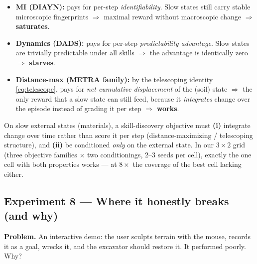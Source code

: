 \documentclass[11pt,a4paper]{article}
\begin{document}
\begin{itemize}[leftmargin=6mm]
\item \textbf{MI (DIAYN):} pays for per-step \emph{identifiability}. Slow states
still carry stable microscopic fingerprints $\Rightarrow$ maximal reward without
macroscopic change $\Rightarrow$ \textbf{saturates}.
\item \textbf{Dynamics (DADS):} pays for per-step \emph{predictability
advantage}. Slow states are trivially predictable under all skills
$\Rightarrow$ the advantage is identically zero $\Rightarrow$ \textbf{starves}.
\item \textbf{Distance-max (METRA family):} by the telescoping identity
\eqref{eq:telescope}, pays for \emph{net cumulative displacement} of the
(soil) state $\Rightarrow$ the only reward that a slow state can still feed,
because it \emph{integrates} change over the episode instead of grading it per
step $\Rightarrow$ \textbf{works}.
\end{itemize}

\begin{keyresult}[title=\textbf{The two-ingredient design law}]
On slow external states (materials), a skill-discovery objective must
\textbf{(i)} integrate change over time rather than score it per step
(distance-maximizing / telescoping structure), and \textbf{(ii)} be conditioned
\emph{only} on the external state. In our $3\times2$ grid (three objective
families $\times$ two conditionings, 2--3 seeds per cell), exactly the one cell
with both properties works --- at $8\times$ the coverage of the best cell
lacking either.
\end{keyresult}

\subsection{Experiment 8 — Where it honestly breaks (and why)}

\textbf{Problem.} An interactive demo: the user sculpts terrain with the mouse,
records it as a goal, wrecks it, and the excavator should restore it. It
performed poorly. Why?
\end{document}
